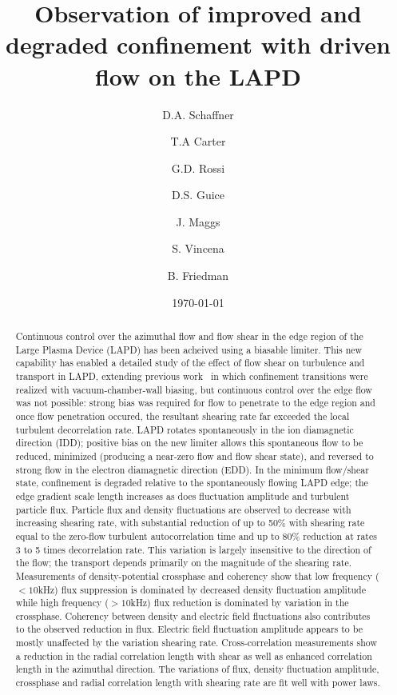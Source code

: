 \documentclass[%
 aps,
 prl,
 amsmath,amssymb,
 reprint,%
]{revtex4-1}
\begin{document}
\title{Observation of improved and degraded confinement with driven flow on the LAPD}
\author{D.A. Schaffner}
\author{T.A Carter}
\author{G.D. Rossi}
\author{D.S. Guice}
\author{J. Maggs}
\author{S. Vincena}
\author{B. Friedman}

\date{\today}%

\begin{abstract}
Continuous control over the azimuthal flow and flow shear in the edge region of the Large Plasma Device (LAPD) has been acheived using a biasable limiter.    This new capability has enabled a detailed study of
the effect of flow shear on turbulence and transport in LAPD,
extending previous work~\cite{Carter:2009} in which confinement
transitions were realized with vacuum-chamber-wall biasing, but continuous control over
the edge flow was not possible: strong bias was required for flow to
penetrate to the edge region and once flow penetration occured, the
resultant shearing rate far exceeded the local turbulent decorrelation
rate.  LAPD rotates spontaneously in the ion diamagnetic direction
(IDD); positive bias on the new limiter allows this spontaneous
flow to be reduced, minimized (producing a near-zero flow and flow
shear state), and reversed to strong flow in the electron diamagnetic
direction (EDD). In the minimum flow/shear state, confinement is degraded relative to the spontaneously flowing LAPD edge;  the edge gradient scale
length increases as does fluctuation amplitude and turbulent particle flux.  Particle flux and density fluctuations are observed to decrease with increasing shearing rate, with substantial reduction of up to 50\% with shearing rate equal to the zero-flow turbulent autocorrelation time and up to 80\% reduction at rates 3 to 5 times decorrelation rate.  This variation is largely insensitive to the direction of the flow; the transport depends primarily on the magnitude of the shearing rate. Measurements of density-potential crossphase and coherency show that low frequency ($<10$kHz) flux suppression is dominated by decreased density fluctuation amplitude while high frequency ($>10$kHz) flux reduction is dominated by variation in the crossphase. Coherency between density and electric field fluctuations also contributes to the observed reduction in flux.  Electric field fluctuation amplitude appears to be mostly unaffected by the variation shearing rate. Cross-correlation measurements show a reduction in the radial correlation length with shear as well as enhanced correlation length in the azimuthal direction.   The variations of flux, density fluctuation amplitude, crossphase and radial correlation length with shearing rate are fit well with power laws.


\end{abstract}
\end{document}
